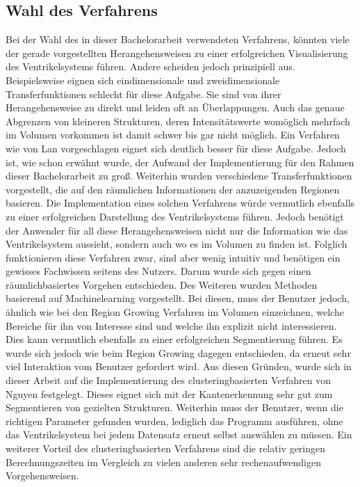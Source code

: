 \subsection{Wahl des Verfahrens}


Bei der Wahl des in dieser Bachelorarbeit verwendeten Verfahrens, könnten viele der gerade vorgestellten Herangehensweisen zu einer erfolgreichen Visualisierung des Ventrikelsystems führen. Andere scheiden jedoch prinzipiell aus.
\newline
Beispielsweise eignen sich eindimensionale und zweidimensionale Transferfunktionen schlecht für diese Aufgabe. Sie sind von ihrer Herangehensweise zu direkt und leiden oft an Überlappungen. Auch das genaue Abgrenzen von kleineren Strukturen, deren Intensitätswerte womöglich mehrfach im Volumen vorkommen ist damit schwer bis gar nicht möglich.
\newline 
Ein Verfahren wie von Lan \cite{lan2017improving} vorgeschlagen eignet sich deutlich besser für diese Aufgabe. Jedoch ist, wie schon erwähnt wurde, der Aufwand der Implementierung für den Rahmen dieser Bachelorarbeit zu groß.
\newline
Weiterhin wurden verschiedene Transferfunktionen vorgestellt, die auf den räumlichen Informationen der anzuzeigenden Regionen basieren. Die Implementation eines solchen Verfahrens würde vermutlich ebenfalls zu einer erfolgreichen Darstellung des Ventrikelsystems führen. Jedoch benötigt der Anwender für all diese Herangehensweisen nicht nur die Information wie das Ventrikelsystem aussieht, sondern auch wo es im Volumen zu finden ist. Folglich funktionieren diese Verfahren zwar, sind aber wenig intuitiv und benötigen ein gewisses Fachwissen seitens des Nutzers. Darum wurde sich gegen einen räumlichbasiertes Vorgehen entschieden.
\newline
Des Weiteren wurden Methoden basierend auf Machinelearning vorgestellt. Bei diesen, muss der Benutzer jedoch, ähnlich wie bei den Region Growing Verfahren im Volumen einzeichnen, welche Bereiche für ihn von Interesse sind und welche ihn explizit nicht interessieren. Dies kann vermutlich ebenfalls zu einer erfolgreichen Segmentierung führen. Es wurde sich jedoch wie beim Region Growing dagegen entschieden, da erneut sehr viel Interaktion vom Benutzer gefordert wird.
\newline
Aus diesen Gründen, wurde sich in dieser Arbeit auf die Implementierung des clusteringbasierten Verfahren von Nguyen \cite{nguyen2012clustering} festgelegt. Dieses eignet sich mit der Kantenerkennung sehr gut zum Segmentieren von gezielten Strukturen. Weiterhin muss der Benutzer, wenn die richtigen Parameter gefunden wurden, lediglich das Programm ausführen, ohne das Ventrikelsystem bei jedem Datensatz erneut selbst auswählen zu müssen. Ein weiterer Vorteil des clusteringbasierten Verfahrens sind die relativ geringen Berechnungszeiten im Vergleich zu vielen anderen sehr rechenaufwendigen Vorgehensweisen. 

